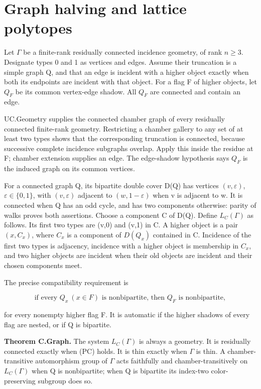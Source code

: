 \section{Graph halving and lattice
polytopes}\label{graph-halving-and-lattice-polytopes}

Let \(\Gamma\) be a finite-rank residually connected incidence geometry,
of rank \(n\ge 3\). Designate types 0 and 1 as vertices and edges.
Assume their truncation is a simple graph Q, and that an edge is
incident with a higher object exactly when both its endpoints are
incident with that object. For a flag F of higher objects, let \(Q_F\)
be its common vertex-edge shadow. All \(Q_F\) are connected and contain
an edge.

UC.Geometry supplies the connected chamber graph of every residually
connected finite-rank geometry. Restricting a chamber gallery to any set
of at least two types shows that the corresponding truncation is
connected, because successive complete incidence subgraphs overlap.
Apply this inside the residue at F; chamber extension supplies an edge.
The edge-shadow hypothesis says \(Q_F\) is the induced graph on its
common vertices.

For a connected graph Q, its bipartite double cover D(Q) has vertices
\((v,\varepsilon )\), \(\varepsilon \in \{0,1\}\), with
\((v,\varepsilon )\) adjacent to \((w,1-\varepsilon )\) when v is
adjacent to w. It is connected when Q has an odd cycle, and has two
components otherwise: parity of walks proves both assertions. Choose a
component C of D(Q). Define \(L_C(\Gamma )\) as follows. Its first two
types are (v,0) and (v,1) in C. A higher object is a pair \((x,C_x)\),
where \(C_x\) is a component of \(D(Q_x)\) contained in C. Incidence of
the first two types is adjacency, incidence with a higher object is
membership in \(C_x\), and two higher objects are incident when their
old objects are incident and their chosen components meet.

The precise compatibility requirement is

\[
\text{if every }Q_x\ (x\in F)\text{ is nonbipartite, then }Q_F
\text{ is nonbipartite},
\tag{PC}
\]

for every nonempty higher flag F. It is automatic if the higher shadows
of every flag are nested, or if Q is bipartite.

\textbf{Theorem C.Graph.} The system \(L_C(\Gamma )\) is always a
geometry. It is residually connected exactly when (PC) holds. It is thin
exactly when \(\Gamma\) is thin. A chamber-transitive automorphism group
of \(\Gamma\) acts faithfully and chamber-transitively on
\(L_C(\Gamma )\) when Q is nonbipartite; when Q is bipartite its
index-two color-preserving subgroup does so.

